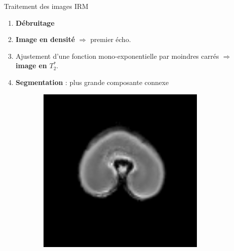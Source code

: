\documentclass[10pt]{beamer}
\begin{document}
\begin{frame}{Traitement des images IRM}

  \begin{enumerate}
  \item \textbf{Débruitage}
  \item \textbf{Image en densité} $\Rightarrow$ premier écho.
  \item Ajustement d'une fonction mono-exponentielle par moindres carrés $\Rightarrow$ \textbf{image en $T_2^*$}.
  \item \textbf{Segmentation} : plus grande composante connexe
  \end{enumerate}

  \begin{figure}[ht]
    \centering
    \begin{subfigure}[t]{0.33\textwidth}
      \centering
      \includegraphics[width=0.9\textwidth]{fig/irm_250_density_s6}
      \caption{}
      \label{subfig:irm_250_density_s6}
    \end{subfigure}%
    \begin{subfigure}[t]{0.33\textwidth}
      \centering

\end{subfigure}
\end{figure}
\end{frame}
\end{document}
